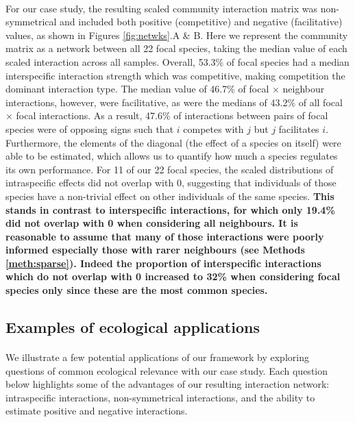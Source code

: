 \documentclass[a4,12pt]{article}
\begin{document}
\begin{refsection}
    \paragraph{}
    For our case study, the resulting scaled community interaction matrix was non-symmetrical and included both positive (competitive) and negative (facilitative) values, as shown in Figures \ref{fig:netwks}.A \& B. Here we represent the community matrix as a network between all 22 focal species, taking the median value of each scaled interaction across all samples. Overall, 53.3\% of focal species had a median interspecific interaction strength which was competitive, making competition the dominant interaction type. The median value of 46.7\% of focal $\times$ neighbour interactions, however, were facilitative, as were the medians of 43.2\% of all focal $\times$ focal interactions. As a result, 47.6\% of interactions between pairs of focal species were of opposing signs such that $i$ competes with $j$ but $j$ facilitates $i$. Furthermore, the elements of the diagonal (the effect of a species on itself) were able to be estimated, which allows us to quantify how much a species regulates its own performance. For 11 of our 22 focal species, the scaled distributions of intraspecific effects did not overlap with 0, suggesting that individuals of those species have a non-trivial effect on other individuals of the same species.
    \textbf{This stands in contrast to interspecific interactions, for which only 19.4\% did not overlap with 0 when considering all neighbours. It is reasonable to assume that many of those interactions were poorly informed especially those with rarer neighbours (see Methods \ref{meth:sparse}). Indeed the proportion of interspecific interactions which do not overlap with 0 increased to 32\% when considering focal species only since these are the most common species.}

    \subsection{Examples of ecological applications}

    \paragraph{}
    We illustrate a few potential applications of our framework by exploring questions of common ecological relevance with our case study. Each question below highlights some of the advantages of our resulting interaction network: intraspecific interactions, non-symmetrical interactions, and the ability to estimate positive and negative interactions. %



\end{refsection}
\end{document}
